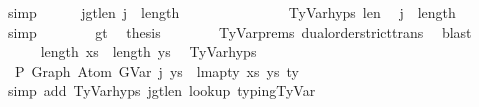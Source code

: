 \begin{isabellebody}
\ simp\isanewline
\isanewline
\ \ \ \ \isamarkupfalse%
\ j{\isacharunderscore}{\kern0pt}gt{\isacharunderscore}{\kern0pt}len{\isacharunderscore}{\kern0pt}{\isasymGamma}{}{\isacharcolon}{\kern0pt}\ {\isachardoublequoteopen}j\ {\isacharless}{\kern0pt}\ length\ {\isasymGamma}{}{\isachardoublequoteclose}\isanewline
\ \ \ \ \isamarkupfalse%
\ {\isacharminus}{\kern0pt}\isanewline
\ \ \ \ \ \ \isamarkupfalse%
\ TyVar{\isachardot}{\kern0pt}hyps{\isacharparenleft}{\kern0pt}{}{\isacharparenright}{\kern0pt}\ len{\isacharunderscore}{\kern0pt}{\isasymGamma}{}\ \isamarkupfalse%
\ {\isachardoublequoteopen}j\ {\isacharless}{\kern0pt}\ length\ {\isasymGamma}{}\ {\isacharplus}{\kern0pt}\ {}{\isachardoublequoteclose}\ \isamarkupfalse%
\ simp\isanewline
\ \ \ \ \ \ \isamarkupfalse%
\ gt\ \isamarkupfalse%
\ {\isacharquery}{\kern0pt}thesis\isanewline
\ \ \ \ \ \ \isamarkupfalse%
\ TyVar{\isachardot}{\kern0pt}prems{\isacharparenleft}{\kern0pt}{}{\isacharparenright}{\kern0pt}\ dual{\isacharunderscore}{\kern0pt}order{\isachardot}{\kern0pt}strict{\isacharunderscore}{\kern0pt}trans{}\ \isamarkupfalse%
\ blast\isanewline
\ \ \ \ \isamarkupfalse%
\isanewline
\isanewline
\ \ \ \ \isamarkupfalse%
\ {\isachardoublequoteopen}length\ xs{\isacharprime}{\kern0pt}\ {\isacharequal}{\kern0pt}\ length\ ys{\isachardoublequoteclose}\ \isamarkupfalse%
\ TyVar{\isachardot}{\kern0pt}hyps{\isacharparenleft}{\kern0pt}{}{\isacharparenright}{\kern0pt}\ \isakeywordONE{{\isachardot}{\kern0pt}}\isamarkupfalse%
\isanewline
\ \ \ \ \isamarkupfalse%
\ \isamarkupfalse%
\ {\isachardoublequoteopen}{\isasymGamma}{}\ {\isasymturnstile}{\isacharbraceleft}{\kern0pt}P{\isacharbraceright}{\kern0pt}\ Graph\ {\isacharparenleft}{\kern0pt}Atom\ {\isacharparenleft}{\kern0pt}GVar\ j{\isacharparenright}{\kern0pt}\ ys{\isacharparenright}{\kern0pt}\ {\isacharcolon}{\kern0pt}\ lmap{\isacharunderscore}{\kern0pt}ty\ xs{\isacharprime}{\kern0pt}\ ys\ ty{\isacharprime}{\kern0pt}{\isachardoublequoteclose}\isanewline
\ \ \ \ \ \ \isamarkupfalse%
\ {\isacharparenleft}{\kern0pt}simp\ add{\isacharcolon}{\kern0pt}\ TyVar{\isachardot}{\kern0pt}hyps{\isacharparenleft}{\kern0pt}{}{\isacharcomma}{\kern0pt}{}{\isacharcomma}{\kern0pt}{}{\isacharparenright}{\kern0pt}\ j{\isacharunderscore}{\kern0pt}gt{\isacharunderscore}{\kern0pt}len{\isacharunderscore}{\kern0pt}{\isasymGamma}{}\ lookup{}\ typing{\isachardot}{\kern0pt}TyVar{\isacharparenright}{\kern0pt}\isanewline

\end{isabellebody}
